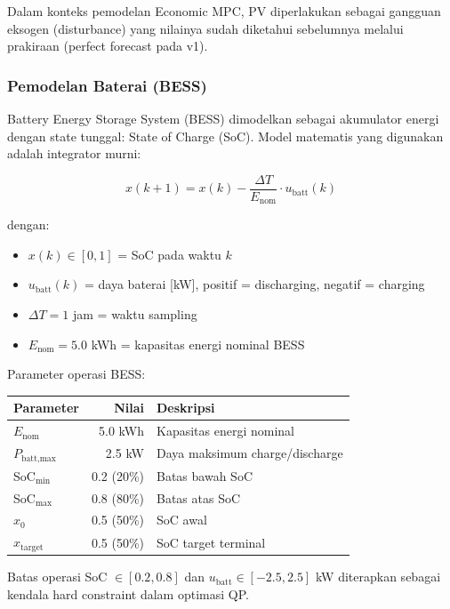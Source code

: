 \documentclass{article}
\begin{document}
Dalam konteks pemodelan Economic MPC, PV diperlakukan sebagai gangguan eksogen (disturbance) yang nilainya sudah diketahui sebelumnya melalui prakiraan (perfect forecast pada v1).

\subsubsection{Pemodelan Baterai (BESS)}

Battery Energy Storage System (BESS) dimodelkan sebagai akumulator energi dengan state tunggal: State of Charge (SoC). Model matematis yang digunakan adalah integrator murni:

\begin{equation}
x(k+1) = x(k) - \frac{\Delta T}{E_{\text{nom}}} \cdot u_{\text{batt}}(k)
\end{equation}

dengan:
\begin{itemize}
    \item $x(k) \in [0, 1]$ = SoC pada waktu $k$
    \item $u_{\text{batt}}(k)$ = daya baterai [kW], positif = discharging, negatif = charging
    \item $\Delta T = 1$ jam = waktu sampling
    \item $E_{\text{nom}} = 5.0$ kWh = kapasitas energi nominal BESS
\end{itemize}

Parameter operasi BESS:

\begin{center}
\begin{tabular}{lrl}
\toprule
Parameter & Nilai & Deskripsi \\
\midrule
$E_{\text{nom}}$ & 5.0 kWh & Kapasitas energi nominal \\
$P_{\text{batt,max}}$ & 2.5 kW & Daya maksimum charge/discharge \\
SoC$_{\text{min}}$ & 0.2 (20\%) & Batas bawah SoC \\
SoC$_{\text{max}}$ & 0.8 (80\%) & Batas atas SoC \\
$x_0$ & 0.5 (50\%) & SoC awal \\
$x_{\text{target}}$ & 0.5 (50\%) & SoC target terminal \\
\bottomrule
\end{tabular}
\end{center}

Batas operasi SoC $\in [0.2, 0.8]$ dan $u_{\text{batt}} \in [-2.5, 2.5]$ kW diterapkan sebagai kendala hard constraint dalam optimasi QP.
\end{document}
